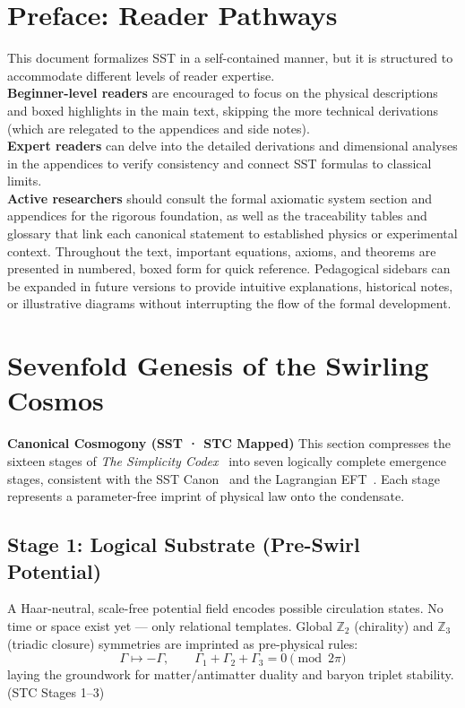 \documentclass[10pt,reprint,aps,onecolumn,nofootinbib]{revtex4-2}
\begin{document}
    	\section*{Preface: Reader Pathways}
	This document formalizes SST in a self-contained manner, but it is structured to accommodate different levels of reader expertise.\\
        \textbf{Beginner-level readers} are encouraged to focus on the physical descriptions and boxed highlights in the main text, skipping the more technical derivations (which are relegated to the appendices and side notes).\\
        \textbf{Expert readers} can delve into the detailed derivations and dimensional analyses in the appendices to verify consistency and connect SST formulas to classical limits.\\
        \textbf{Active researchers} should consult the formal axiomatic system section and appendices for the rigorous foundation, as well as the traceability tables and glossary that link each canonical statement to established physics or experimental context. Throughout the text, important equations, axioms, and theorems are presented in numbered, boxed form for quick reference. Pedagogical sidebars can be expanded in future versions to provide intuitive explanations, historical notes, or illustrative diagrams without interrupting the flow of the formal development.



        \newpage
        \tableofcontents
        \newpage
\section{Sevenfold Genesis of the Swirling Cosmos}
\label{sec:cosmogony-seven}

\noindent
\textbf{Canonical Cosmogony (SST · STC Mapped)}
This section compresses the sixteen stages of \emph{The Simplicity Codex}~\cite{Goldau2025_STC}
into seven logically complete emergence stages, consistent with the SST Canon~\canonversion{}
and the Lagrangian EFT~\cite{Iskandarani2025_Lagrangian}.
Each stage represents a parameter-free imprint of physical law onto the condensate.

\subsection*{Stage 1: Logical Substrate (Pre-Swirl Potential)}
A Haar-neutral, scale-free potential field encodes possible circulation states.
No time or space exist yet — only relational templates.
Global $\mathbb{Z}_2$ (chirality) and $\mathbb{Z}_3$ (triadic closure) symmetries are imprinted as pre-physical rules:
\[
\Gamma \mapsto -\Gamma,
\qquad
\Gamma_1 + \Gamma_2 + \Gamma_3 = 0 \pmod{2\pi}
\]
laying the groundwork for matter/antimatter duality and baryon triplet stability.
\hfill (STC Stages 1–3)
\end{document}
